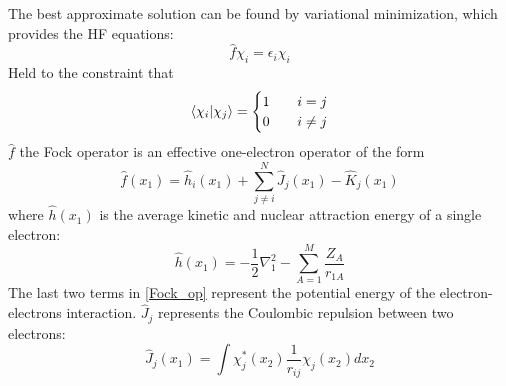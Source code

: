     The best approximate solution can be found by variational minimization, which provides the HF equations:
      \begin{equation} \label{Fock_eq}
      \hat{f}\chi_i = \epsilon_i \chi_i
      \end{equation}
    Held to the constraint that
      \begin{equation}
        \langle \chi_i|\chi_j\rangle = 
          \begin{cases}
          1  & \quad i=j\\
          0  & \quad i\neq j
          \end{cases}
      \end{equation}
    $\hat{f}$ the Fock operator is an effective one-electron operator of the form 
      \begin{equation} \label{Fock_op}
      \hat{f}(x_1) = \hat{h}_i(x_1)  + \sum_{j\neq i}^N \hat{J}_j(x_1) - \hat{K}_j(x_1)
      \end{equation}
    where $\hat{h}(x_1)$ is the average kinetic and nuclear attraction energy of a single electron: 
      \begin{equation} \label{h}
      \hat{h}(x_1) = -\frac{1}{2} \nabla_1^2 - \sum_{A=1}^M \frac{Z_A}{r_{1A}}
      \end{equation}
    The last two terms in \cref{Fock_op} represent the potential energy of the electron-electrons interaction. $\hat{J}_j$ represents the Coulombic repulsion between two electrons:
      \begin{equation} \label{j}
      \hat{J}_j(x_1) = \int \chi_j^*(x_2) \frac{1}{r_{ij}} \chi_j(x_2) dx_2
      \end{equation}
